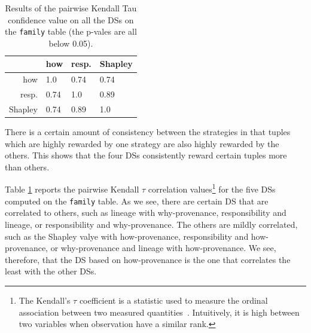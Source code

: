 \documentclass[preprint,12pt,sort&compress]{elsarticle}
\newcommand{\rtwo}[1]{\textcolor{reviewer2}{#1}}
\begin{document}

\begin{table}[]
\center
  \caption{\rtwo{Results of the pairwise Kendall Tau confidence value on all the DSs on the \texttt{family} table (the p-vales are all below 0.05).}}
  \begin{tabular}{|r|l|l|l|}
  \hline
 & how & resp. & Shapley \\
  \hline
 how & 1.0 & 0.74 & 0.74  \\
 resp. & 0.74 & 1.0 & 0.89 \\
Shapley & 0.74 & 0.89 & 1.0 \\
 \hline
  \end{tabular}
  \label{table:kendall_tau}
\end{table}
\normalsize


There is a certain amount of consistency between the strategies in that tuples which are highly rewarded by one strategy are also highly rewarded by the others. This shows that the four DSs consistently reward certain tuples more than others. 

\rtwo{Table \ref{table:kendall_tau} reports the pairwise Kendall $\tau$ correlation values\footnote{The Kendall's $\tau$ coefficient is a statistic used to measure the ordinal association between two measured quantities~\cite{Kendall1938new}. Intuitively, it is high between two variables when observation have a similar rank.} for the five DSs computed on the \texttt{family} table. As we see, there are certain DS that are correlated to others, such as lineage with why-provenance, responsibility and lineage, or responsibility and why-provenance. 
The others are mildly correlated, such as the Shapley valye with how-provenance, responsibility and how-provenance, or why-provenance and lineage with how-provenance. We see, therefore, that the DS based on how-provenance is the one that correlates the least with the other DSs.}
\end{document}
